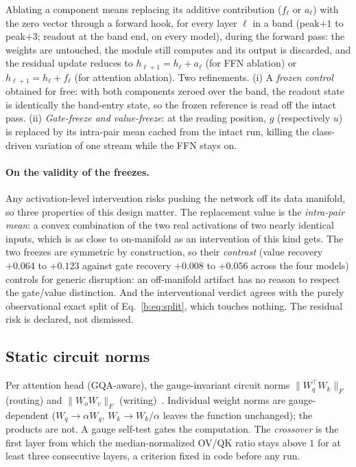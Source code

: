 \documentclass[11pt]{article}
\begin{document}
Ablating a component means replacing its additive contribution ($f_{\ell}$
or $a_{\ell}$) with the zero vector through a forward hook, for every layer
$\ell$ in a band (peak$+1$ to peak$+3$; readout at the band end, on every
model), during the forward pass: the weights are untouched, the module still
computes and its output is discarded, and the residual update reduces to
$h_{\ell+1} = h_{\ell} + a_{\ell}$ (for FFN ablation) or
$h_{\ell+1} = h_{\ell} + f_{\ell}$ (for attention ablation). Two
refinements. (i) A
\emph{frozen control} obtained for free: with both components zeroed over
the band, the readout state is identically the band-entry state, so the
frozen reference is read off the intact pass. (ii) \emph{Gate-freeze and
value-freeze}: at the reading position, $g$ (respectively $u$) is replaced
by its intra-pair mean cached from the intact run, killing the class-driven
variation of one stream while the FFN stays on.

\paragraph{On the validity of the freezes.} Any activation-level
intervention risks pushing the network off its data manifold, so three
properties of this design matter. The replacement value is the
\emph{intra-pair mean}: a convex combination of the two real activations
of two nearly identical inputs, which is as close to on-manifold as an
intervention of this kind gets. The two freezes are symmetric by
construction, so their \emph{contrast} (value recovery $+0.064$ to
$+0.123$ against gate recovery $+0.008$ to $+0.056$ across the four
models) controls for generic disruption: an off-manifold artifact has no
reason to respect the gate/value distinction. And the interventional
verdict agrees with the purely observational exact split of
Eq.~\ref{b:eq:split}, which touches nothing. The residual risk is
declared, not dismissed.


\subsection{Static circuit norms}
\label{b:sec:circuits}

Per attention head (GQA-aware), the gauge-invariant circuit norms
$\lVert W_q^{\top} W_k \rVert_F$ (routing) and $\lVert W_o W_v \rVert_F$
(writing)~\cite{elhage2021}. Individual weight norms are gauge-dependent
($W_q \to \alpha W_q$, $W_k \to W_k / \alpha$ leaves the function
unchanged); the products are not. A gauge self-test gates the computation.
The \emph{crossover} is the first layer from which the median-normalized
OV/QK ratio stays above $1$ for at least three consecutive layers, a
criterion fixed in code before any run.
\end{document}
